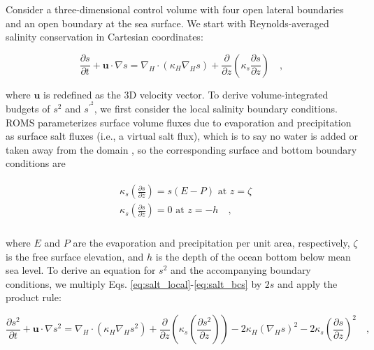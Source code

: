 \documentclass[draft]{agujournal2019}
\begin{document}
Consider a three-dimensional control volume with four open lateral boundaries and an open boundary at the sea surface. We start with Reynolds-averaged salinity conservation in Cartesian coordinates:
\begin{linenomath*}
\begin{equation} \label{eq:salt_local}
    \frac{\partial s}{\partial t}+ \textbf{u} \cdot \nabla s =\nabla_H \cdot (\kappa_H \nabla_H s)+  \frac{\partial}{\partial z} \left(\kappa_s {\frac{\partial s}{\partial z}} \right) \quad ,
\end{equation}
\end{linenomath*}
where $\mathbf{u}$ is redefined as the 3D velocity vector. To derive volume-integrated budgets of $s^2$ and $s^{\prime^2}$, we first consider the local salinity boundary conditions. ROMS parameterizes surface volume fluxes due to evaporation and precipitation as surface salt fluxes (i.e., a virtual salt flux), which is to say no water is added or taken away from the domain \cite{nagy2020regional, roullet2000salt, shchepetkin2005regional}, so the corresponding surface and bottom boundary conditions are
\begin{linenomath*}
\begin{align} \label{eq:salt_bcs}
    \begin{split}
        & \kappa_s \left({\frac{\partial s}{\partial z}} \right) = s(E-P) \,\, \textrm{at} \,\, z = \zeta \\
        & \kappa_s \left({\frac{\partial s}{\partial z}} \right) = 0 \,\, \textrm{at} \,\, z = -h \quad , \\
    \end{split}
\end{align} 
\end{linenomath*}
where $E$ and $P$ are the evaporation and precipitation per unit area, respectively, $\zeta$ is the free surface elevation, and $h$ is the depth of the ocean bottom below mean sea level. To derive an equation for $s^2$ and the accompanying boundary conditions, we multiply Eqs. \ref{eq:salt_local}-\ref{eq:salt_bcs} by $2s$ and apply the product rule:
\begin{linenomath*}
\begin{equation} \label{eq:s2_local}
    \frac{\partial s^2}{\partial t} + \textbf{u} \cdot \nabla s^2   = \nabla_H \cdot (\kappa_H \nabla_H s^2) + \frac{\partial }{\partial z}\left(\kappa_s \left(\frac{\partial s^2}{\partial z} \right) \right) - 2\kappa_H(\nabla_H s)^2 -2\kappa_s \left(\frac{\partial s}{\partial z} \right)^2 \quad ,
\end{equation}
\end{linenomath*}
\end{document}

